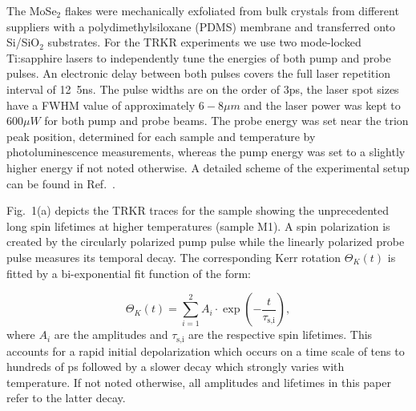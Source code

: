 \documentclass[prb,aps,superscriptaddress,reprint]{revtex4-1}
\begin{document}
The MoSe$_2$ flakes were mechanically exfoliated from bulk crystals from different suppliers with a polydimethylsiloxane (PDMS) membrane and transferred onto Si/SiO$_2$ substrates.\cite{2DMaterials.1.011022,2DMaterials.4.025030} For the TRKR experiments we use two mode-locked Ti:sapphire lasers to independently tune the energies of both pump and probe pulses. An electronic delay between both pulses covers the full laser repetition interval of \unit{12.5}{ns}. The pulse widths are on the order of \unit{3}{ps}, the laser spot sizes have a FWHM value of approximately $\unit{6-8}{\mu m}$ and the laser power was kept to $\unit{600}{\mu W}$ for both pump and probe beams. The probe energy was set near the trion peak position, determined for each sample and temperature by photoluminescence measurements, whereas the pump energy was set to a slightly higher energy if not noted otherwise. A detailed scheme of the experimental setup can be found in Ref.~. 

Fig.~1(a) depicts the TRKR traces for the sample showing the unprecedented long spin lifetimes at higher temperatures (sample M1). A spin polarization is created by the circularly polarized pump pulse while the linearly polarized probe pulse measures its temporal decay. The corresponding Kerr rotation $\Theta_{K}(t)$ is fitted by a bi-exponential fit function of the form: 

\begin{equation}
\Theta_{K}(t) =\sum_{i=1}^2 A_i \cdot \exp \left( -\frac{t}{\tau_\text{s,i}} \right),
\label{eq:Fit}
\end{equation}
 where $A_{i}$ are the amplitudes and $\tau_\text{s,i}$ are the respective spin lifetimes. This accounts for a rapid initial depolarization which occurs on a time scale of tens to hundreds of ps followed by a slower decay which strongly varies with temperature. If not noted otherwise, all amplitudes and lifetimes in this paper refer to the latter decay.
 
\end{document}

